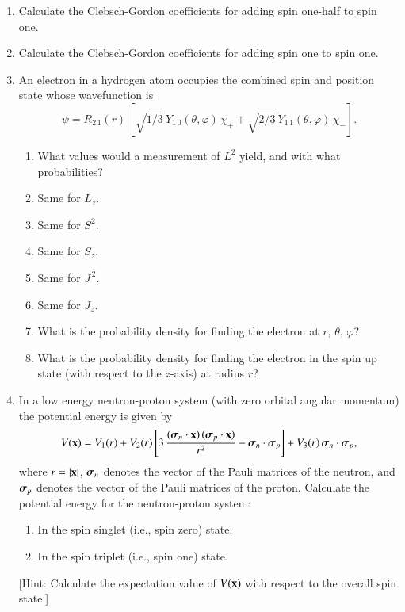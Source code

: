 \begin{enumerate}[label=\thechapter.\arabic*,leftmargin=*,widest=9.20]

\item Calculate the Clebsch-Gordon coefficients for adding spin one-half
to spin one. 

\item Calculate the Clebsch-Gordon coefficients for adding spin one 
to spin one. 

\item An electron in a hydrogen atom occupies the combined spin
and position state whose wavefunction is 
$$
\psi = R_{2\,1}(r)\,\left[\sqrt{1/3}\,Y_{1\,0}(\theta,\varphi)\,\chi_+ + \sqrt{2/3}\,Y_{1\,1}(\theta,\varphi)\,\chi_-\right].
$$
\begin{enumerate}
\item What values would a measurement of $L^2$ yield, and with
what probabilities?
\item Same for $L_z$.
\item Same for $S^2$.
\item Same for $S_z$.
\item Same for $J^{\,2}$.
\item Same for $J_z$.
\item What is the probability density for finding the electron at
$r$, $\theta$, $\varphi$?
\item What is the probability density for finding the electron in the
spin up state (with respect to the $z$-axis) at radius $r$?
\end{enumerate}

\item In a low energy neutron-proton system (with zero orbital angular
momentum) the potential energy is given by
$$
V({\bf x}) = V_1(r) + V_2(r)\left[3\,\frac{(\mbox{\boldmath$\sigma$}_n\cdot{\bf x})\,(\mbox{\boldmath$\sigma$}_p\cdot
{\bf x})}{r^2} -\mbox{\boldmath$\sigma$}_n\cdot\mbox{\boldmath$\sigma$}_p\right] + V_3(r)\,\mbox{\boldmath$\sigma$}_n\cdot\mbox{\boldmath$\sigma$}_p,
$$
where $r=|{\bf x}|$, $\mbox{\boldmath$\sigma$}_n$ denotes the vector of the Pauli matrices of the neutron,
and $\mbox{\boldmath$\sigma$}_p$ denotes the vector of the Pauli matrices of the proton. Calculate
the potential energy for the neutron-proton system:
\begin{enumerate}
\item In the spin singlet (i.e., spin zero) state.
\item In the spin triplet (i.e., spin one) state.
\end{enumerate}
[Hint: Calculate the expectation value of $V({\bf x})$ with respect to the overall spin state.]


\end{enumerate}
